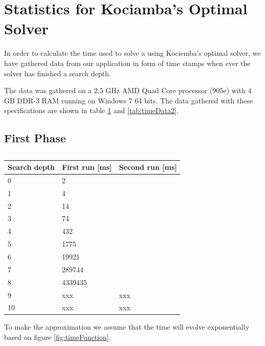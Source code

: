 \section{Statistics for Kociamba's Optimal Solver}
\label{app:kociembaTime}
In order to calculate the time used to solve a \rubik{} using Kociemba's optimal solver, we have gathered data from our application in form of time stamps when ever the solver has finished a search depth.

The data was gathered on a 2.5 GHz AMD Quad Core processor (905e) with 4 GB DDR-3 RAM running on Windows 7 64 bits.
The data gathered with these specifications are shown in table \ref{tab:timeData} and \ref{tab:timeData2}.

\subsection{First Phase}

\begin{table}[hb]
\centering
	\begin{tabular}{|l|l|l|}
	\hline
	Search depth&First run [ms]&Second run [ms]\\
	\hline
	0&2&\\
	\hline
	1&4&\\
	\hline
	2&14&\\
	\hline
	3&74&\\
	\hline
	4&432&\\
	\hline
	5&1775&\\
	\hline
	6&19921&\\
	\hline
	7&289744&\\
	\hline
	8&4339435&\\
	\hline
	9&xxx&xxx\\
	\hline
	10&xxx&xxx\\
	\hline
	\end{tabular}
\caption{}
	\label{tab:timeData}
\end{table}

To make the approximation we assume that the time will evolve exponentially based on figure \ref{fig:timeFunction}.

